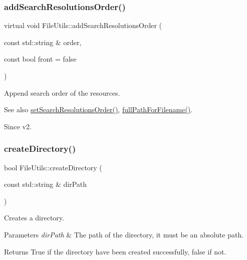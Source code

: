 \subsubsection{\texorpdfstring{add\+Search\+Resolutions\+Order()}{addSearchResolutionsOrder()}\hspace{0.1cm}{\footnotesize\ttfamily [2/2]}}
{\footnotesize\ttfamily virtual void File\+Utils\+::add\+Search\+Resolutions\+Order (\begin{DoxyParamCaption}\item[{const std\+::string \&}]{order,  }\item[{const bool}]{front = {\ttfamily false} }\end{DoxyParamCaption})\hspace{0.3cm}{\ttfamily [virtual]}}

Append search order of the resources.

\begin{DoxySeeAlso}{See also}
\hyperlink{classFileUtils_ac99445fa3112510c8f019c9f38a4779f}{set\+Search\+Resolutions\+Order()}, \hyperlink{classFileUtils_a678409294ab5f13195b109e503f6a1df}{full\+Path\+For\+Filename()}. 
\end{DoxySeeAlso}
\begin{DoxySince}{Since}
v2. 
\end{DoxySince}
\mbox{\label{classFileUtils_a04129d55c22dfa031fd45aeda4de5e77}} 
\subsubsection{\texorpdfstring{create\+Directory()}{createDirectory()}\hspace{0.1cm}{\footnotesize\ttfamily [1/3]}}
{\footnotesize\ttfamily bool File\+Utils\+::create\+Directory (\begin{DoxyParamCaption}\item[{const std\+::string \&}]{dir\+Path }\end{DoxyParamCaption})\hspace{0.3cm}{\ttfamily [virtual]}}

Creates a directory.


\begin{DoxyParams}{Parameters}
{\em dir\+Path} & The path of the directory, it must be an absolute path. \\
\hline
\end{DoxyParams}
\begin{DoxyReturn}{Returns}
True if the directory have been created successfully, false if not. 
\end{DoxyReturn}


